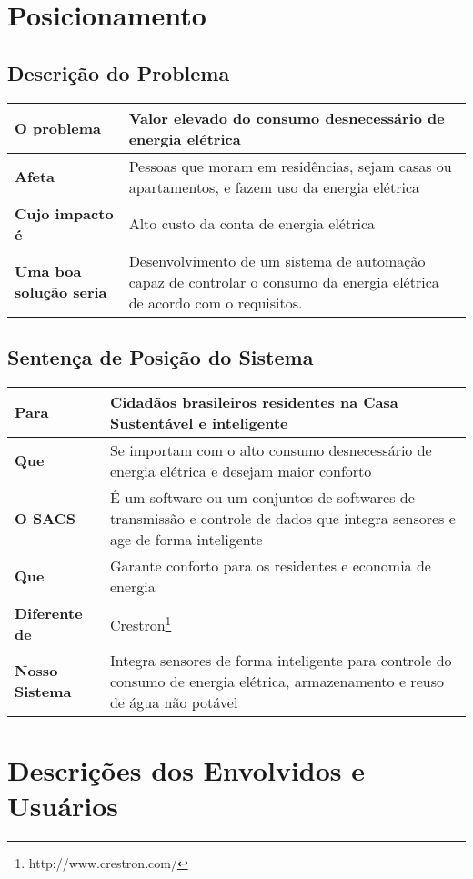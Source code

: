 \section{Posicionamento}

\subsection{Descrição do Problema}

\begin{longtable}{|l|m{7cm}|}
	\hline \textbf{O problema} & Valor elevado do consumo desnecessário de energia elétrica\\
	\hline \textbf{Afeta} & Pessoas que moram em residências, sejam casas ou apartamentos, e fazem uso da energia elétrica\\
	\hline \textbf{Cujo impacto é} & Alto custo da conta de energia elétrica\\
	\hline \textbf{Uma boa solução seria} & Desenvolvimento de um sistema de automação capaz de controlar o consumo da energia elétrica de acordo com o requisitos.\\
	\hline
\end{longtable}

\subsection{Sentença de Posição do Sistema}

\begin{longtable}{|l|m{7cm}|}
	\hline \textbf{Para} & Cidadãos brasileiros residentes na Casa Sustentável e inteligente \\
	\hline \textbf{Que} & Se importam com o alto consumo desnecessário de energia elétrica e desejam maior conforto\\
	\hline \textbf{O SACS} & É um software ou um conjuntos de softwares de transmissão e controle de dados que integra sensores e age de forma inteligente\\
	\hline \textbf{Que} & Garante conforto para os residentes e economia de energia\\
	\hline \textbf{Diferente de} & Crestron\footnote{http://www.crestron.com/}\\
	\hline \textbf{Nosso Sistema} & Integra sensores de forma inteligente para controle do consumo de energia elétrica, armazenamento e reuso de água não potável\\
	\hline
\end{longtable}

\section{Descrições dos Envolvidos e Usuários}

